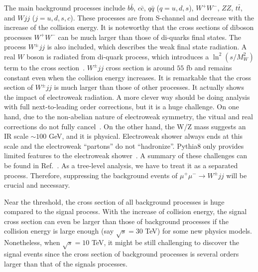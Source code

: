 \documentclass[a4paper,11pt]{article}
\begin{document}
The main background processes include $b\bar{b}$, $c\bar{c}$, $q\bar{q}$ ($q=u,d,s$), $W^+ W^-$, $ZZ$, $t \bar{t}$, and $Wjj$ ($j=u,d,s,c$). 
These processes are from S-channel and decrease with the increase of the collision energy. 
It is noteworthy that the cross sections of diboson processes $W^+W^-$ can be much larger than those of di-quarks final states. 
The process $W^\pm jj$ is also included, which describes the weak final state radiation. 
A real $W$ boson is radiated from di-quark process, which introduces a $\ln^2(s/M^2_{W})$ term to the cross section~\cite{Bell:2010gi}.  
$W^\pm jj$ cross section is around $55$ fb and remains constant even when the collision energy increases. 
It is remarkable that the cross section of $W^\pm jj$ is much larger than those of other processes. 
It actually shows the impact of electroweak radiation. 
A more clever way should be doing analysis with full next-to-leading order corrections, 
but it is a huge challenge. 
On one hand, 
due to the non-abelian nature of electroweak symmetry, the vitual and real corrections do not fully cancel~\cite{Ciafaloni:2000df,Ciafaloni:2000rp}.
On the other hand, 
the W/Z mass suggests an IR scale $\sim 100$ GeV, and it is physical. 
Electroweak shower always ends at this scale and the electroweak ``partons'' do not ``hadronize''. 
Pythia8 only provides limited features to the electroweak shower~\cite{Christiansen:2014kba,Christiansen:2015jpa}. 
A summary of these challenges can be found in Ref.~\cite{Accettura:2023ked}.
As a tree-level analysis, we have to treat it as a separated process.
Therefore, suppressing the background events of $\mu^+ \mu^- \to W^\pm jj$ will be crucial and necessary.

Near the threshold, the cross section of all background processes is huge compared to the signal process. 
With the increase of collision energy, 
the signal cross section can even be larger than those of background processes if the collision energy is large enough (say $\sqrt{s}=30$ TeV) for some new physics models. 
Nonetheless, when $\sqrt{s}=10$ TeV, it might be still challenging to discover the signal events since the cross section of background processes is several orders larger than that of the signals processes.
\end{document}

